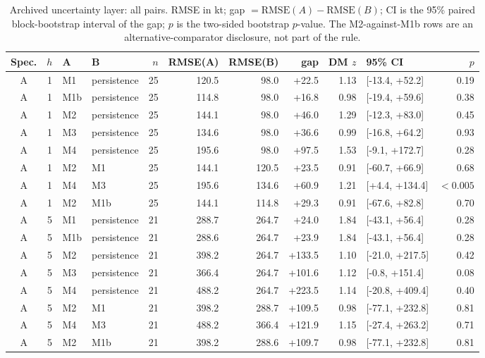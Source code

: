 \documentclass[preprint,11pt,authoryear]{elsarticle}
\theoremstyle{remark}
\newcommand{\RMSE}{\mathrm{RMSE}}
\begin{document}
\begin{table}[!htb]
\centering\scriptsize
\setlength{\tabcolsep}{3.5pt}
\caption{Archived uncertainty layer: all pairs. RMSE in kt; gap $=\RMSE(A)-\RMSE(B)$; CI is the 95\% paired block-bootstrap interval of the gap; $p$ is the two-sided bootstrap $p$-value. The M2-against-M1b rows are an alternative-comparator disclosure, not part of the rule.}
\label{tab:si_dm}
\begin{tabular}{@{}ccllrrrrrlr@{}}
\toprule
Spec. & $h$ & A & B & $n$ & RMSE(A) & RMSE(B) & gap & DM $z$ & 95\% CI & $p$ \\
\midrule
A & 1 & M1 & persistence & 25 & 120.5 & 98.0 & +22.5 & 1.13 & [-13.4, +52.2] & 0.19 \\
A & 1 & M1b & persistence & 25 & 114.8 & 98.0 & +16.8 & 0.98 & [-19.4, +59.6] & 0.38 \\
A & 1 & M2 & persistence & 25 & 144.1 & 98.0 & +46.0 & 1.29 & [-12.3, +83.0] & 0.45 \\
A & 1 & M3 & persistence & 25 & 134.6 & 98.0 & +36.6 & 0.99 & [-16.8, +64.2] & 0.93 \\
A & 1 & M4 & persistence & 25 & 195.6 & 98.0 & +97.5 & 1.53 & [-9.1, +172.7] & 0.28 \\
A & 1 & M2 & M1 & 25 & 144.1 & 120.5 & +23.5 & 0.91 & [-60.7, +66.9] & 0.68 \\
A & 1 & M4 & M3 & 25 & 195.6 & 134.6 & +60.9 & 1.21 & [+4.4, +134.4] & $<0.005$ \\
A & 1 & M2 & M1b & 25 & 144.1 & 114.8 & +29.3 & 0.91 & [-67.6, +82.8] & 0.70 \\
A & 5 & M1 & persistence & 21 & 288.7 & 264.7 & +24.0 & 1.84 & [-43.1, +56.4] & 0.28 \\
A & 5 & M1b & persistence & 21 & 288.6 & 264.7 & +23.9 & 1.84 & [-43.1, +56.4] & 0.28 \\
A & 5 & M2 & persistence & 21 & 398.2 & 264.7 & +133.5 & 1.10 & [-21.0, +217.5] & 0.42 \\
A & 5 & M3 & persistence & 21 & 366.4 & 264.7 & +101.6 & 1.12 & [-0.8, +151.4] & 0.08 \\
A & 5 & M4 & persistence & 21 & 488.2 & 264.7 & +223.5 & 1.14 & [-20.8, +409.4] & 0.40 \\
A & 5 & M2 & M1 & 21 & 398.2 & 288.7 & +109.5 & 0.98 & [-77.1, +232.8] & 0.81 \\
A & 5 & M4 & M3 & 21 & 488.2 & 366.4 & +121.9 & 1.15 & [-27.4, +263.2] & 0.71 \\
A & 5 & M2 & M1b & 21 & 398.2 & 288.6 & +109.7 & 0.98 & [-77.1, +232.8] & 0.81 \\

\end{tabular}
\end{table}
\end{document}

